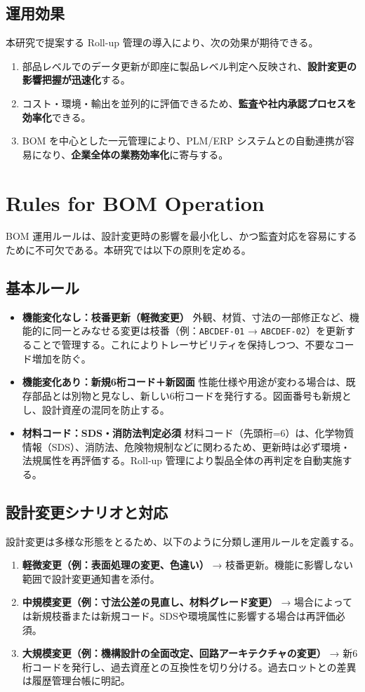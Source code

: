 \documentclass[10pt,conference]{IEEEtran}
\begin{document}
\subsection{運用効果}
本研究で提案する Roll-up 管理の導入により、次の効果が期待できる。
\begin{enumerate}
  \item 部品レベルでのデータ更新が即座に製品レベル判定へ反映され、\textbf{設計変更の影響把握が迅速化}する。
  \item コスト・環境・輸出を並列的に評価できるため、\textbf{監査や社内承認プロセスを効率化}できる。
  \item BOM を中心とした一元管理により、PLM/ERP システムとの自動連携が容易になり、\textbf{企業全体の業務効率化}に寄与する。
\end{enumerate}

\section{Rules for BOM Operation}
BOM 運用ルールは、設計変更時の影響を最小化し、かつ監査対応を容易にするために不可欠である。本研究では以下の原則を定める。

\subsection{基本ルール}
\begin{itemize}
  \item \textbf{機能変化なし：枝番更新（軽微変更）}  
  外観、材質、寸法の一部修正など、機能的に同一とみなせる変更は枝番（例：\texttt{ABCDEF-01} → \texttt{ABCDEF-02}）を更新することで管理する。これによりトレーサビリティを保持しつつ、不要なコード増加を防ぐ。
  \item \textbf{機能変化あり：新規6桁コード＋新図面}  
  性能仕様や用途が変わる場合は、既存部品とは別物と見なし、新しい6桁コードを発行する。図面番号も新規とし、設計資産の混同を防止する。
  \item \textbf{材料コード：SDS・消防法判定必須}  
  材料コード（先頭桁=6）は、化学物質情報（SDS）、消防法、危険物規制などに関わるため、更新時は必ず環境・法規属性を再評価する。Roll-up 管理により製品全体の再判定を自動実施する。
\end{itemize}

\subsection{設計変更シナリオと対応}
設計変更は多様な形態をとるため、以下のように分類し運用ルールを定義する。
\begin{enumerate}
  \item \textbf{軽微変更（例：表面処理の変更、色違い）}  
  → 枝番更新。機能に影響しない範囲で設計変更通知書を添付。
  \item \textbf{中規模変更（例：寸法公差の見直し、材料グレード変更）}  
  → 場合によっては新規枝番または新規コード。SDSや環境属性に影響する場合は再評価必須。
  \item \textbf{大規模変更（例：機構設計の全面改定、回路アーキテクチャの変更）}  
  → 新6桁コードを発行し、過去資産との互換性を切り分ける。過去ロットとの差異は履歴管理台帳に明記。
\end{enumerate}
\end{document}

